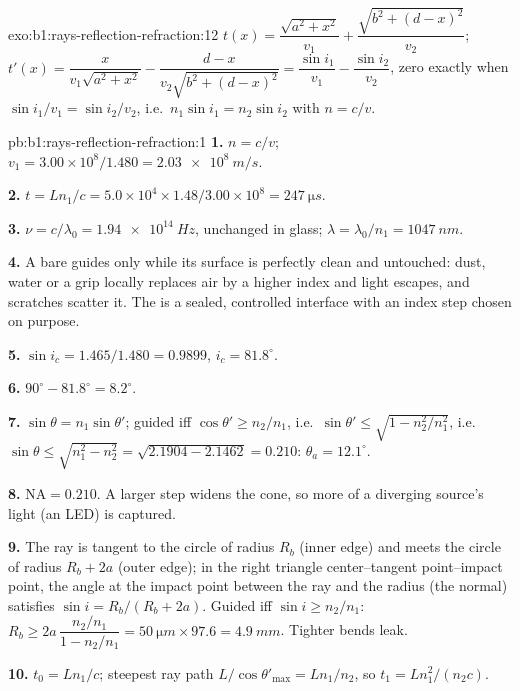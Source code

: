 \begin{solution}{exo:b1:rays-reflection-refraction:12}
$t(x) = \dfrac{\sqrt{a^2 + x^2}}{v_1} + \dfrac{\sqrt{b^2 + (d - x)^2}}{v_2}$;
$t'(x) = \dfrac{x}{v_1\sqrt{a^2 + x^2}} - \dfrac{d - x}{v_2\sqrt{b^2 + (d - x)^2}}
= \dfrac{\sin i_1}{v_1} - \dfrac{\sin i_2}{v_2}$, zero exactly when
$\sin i_1/v_1 = \sin i_2/v_2$, i.e.\ $n_1\sin i_1 = n_2\sin i_2$ with
$n = c/v$.
\end{solution}

\begin{solution}{pb:b1:rays-reflection-refraction:1}
\textbf{1.} $n = c/v$; $v_1 = 3.00\times10^8/1.480 = \qty{2.03e8}{m/s}$.

\textbf{2.} $t = Ln_1/c = 5.0\times10^4 \times 1.48/3.00\times10^8 =
\qty{247}{\micro s}$.

\textbf{3.} $\nu = c/\lambda_0 = \qty{1.94e14}{Hz}$, unchanged in glass;
$\lambda = \lambda_0/n_1 = \qty{1047}{nm}$.

\textbf{4.} A bare  guides only while its surface is perfectly
clean and untouched: dust, water or a grip locally replaces air by a
higher index and light escapes, and scratches scatter it. The 
is a sealed, controlled interface with an index step chosen on purpose.

\textbf{5.} $\sin i_c = 1.465/1.480 = 0.9899$, $i_c = 81.8^\circ$.

\textbf{6.} $90^\circ - 81.8^\circ = 8.2^\circ$.

\textbf{7.} $\sin\theta = n_1\sin\theta'$; guided iff $\cos\theta' \geq
n_2/n_1$, i.e.\ $\sin\theta' \leq \sqrt{1 - n_2^2/n_1^2}$, i.e.\
$\sin\theta \leq \sqrt{n_1^2 - n_2^2} = \sqrt{2.1904 - 2.1462} = 0.210$:
$\theta_a = 12.1^\circ$.

\textbf{8.} $\mathrm{NA} = 0.210$. A larger step widens the cone, so
more of a diverging source's light (an LED) is captured.

\textbf{9.} The ray is tangent to the circle of radius $R_b$ (inner
edge) and meets the circle of radius $R_b + 2a$ (outer edge); in the
right triangle center--tangent point--impact point, the angle at the
impact point between the ray and the radius (the normal) satisfies
$\sin i = R_b/(R_b + 2a)$. Guided iff $\sin i \geq n_2/n_1$:
$R_b \geq 2a\,\dfrac{n_2/n_1}{1 - n_2/n_1} = \qty{50}{\micro m} \times 97.6
= \qty{4.9}{mm}$. Tighter bends leak.

\textbf{10.} $t_0 = Ln_1/c$; steepest ray path $L/\cos\theta'_{\max} =
Ln_1/n_2$, so $t_1 = Ln_1^2/(n_2 c)$.


\end{solution}
